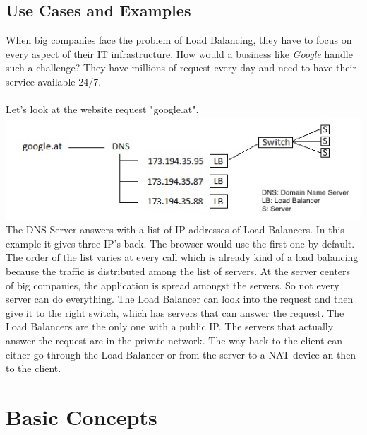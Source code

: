 \documentclass[12p]{article}
\begin{document}
	\subsection{Use Cases and Examples}
	When big companies face the problem of Load Balancing, they have to focus on every aspect of their IT infrastructure. How would a business like \textit{Google} handle such a challenge? They have millions of request every day and need to have their service available 24/7. \\\\
	Let's look at the website request "google.at".\\
	\includegraphics[width=\textwidth]{img/example}
 	The DNS Server answers with a list of IP addresses of Load Balancers. In this example it gives three IP's back. The browser would use the first one by default. The order of the list varies at every call which is already kind of a load balancing because the traffic is distributed among the list of servers. At the server centers of big companies, the application is spread amongst the servers. So not every server can do everything. The Load Balancer can look into the request and then give it to the right switch, which has servers that can answer the request. The Load Balancers are the only one with a public IP. The servers that actually answer the request are in the private network. The way back to the client can either go through the Load Balancer or from the server to a NAT device an then to the client.
	
	\newpage
	\section{Basic Concepts}
\end{document}
